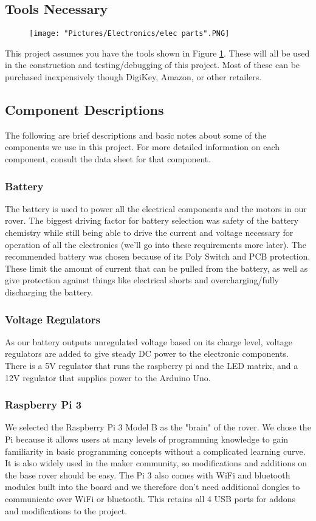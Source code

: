 \documentclass[12pt]{article}
\begin{document}
\subsection{Tools Necessary}

\begin{figure}[H]
  	\centering
   	\texttt{[image: "Pictures/Electronics/elec parts".PNG]}
  	\caption{}
	\label{elec parts}
\end{figure}

This project assumes you have the tools shown in Figure \ref{elec parts}. These will all be used in the construction and testing/debugging of this project. Most of these can be purchased inexpensively though DigiKey, Amazon, or other retailers. 

\subsection{Component Descriptions}
The following are brief descriptions and basic notes about some of the components we use in this project. For more detailed information on each component, consult the data sheet for that component. 
\subsubsection{Battery}
The battery is used to power all the electrical components and the motors in our rover. The biggest driving factor for battery selection was safety of the battery chemistry while still being able to drive the current and voltage necessary for operation of all the electronics (we'll go into these requirements more later). The recommended battery was chosen because of its Poly Switch and PCB protection. These limit the amount of current that can be pulled from the battery, as well as give protection against things like electrical shorts and overcharging/fully discharging the battery. 
\subsubsection{Voltage Regulators}
As our battery outputs unregulated voltage based on its charge level, voltage regulators are added to give steady DC power to the electronic components. There is a 5V regulator that runs the raspberry pi and the LED matrix, and a 12V regulator that supplies power to the Arduino Uno. 
\subsubsection{Raspberry Pi 3}
We selected the Raspberry Pi 3 Model B as the "brain" of the rover. We chose the Pi because it allows users at many levels of programming knowledge to gain familiarity in basic programming concepts without a complicated learning curve. It is also widely used in the maker community, so modifications and additions on the base rover should be easy. The Pi 3 also comes with WiFi and bluetooth modules built into the board and we therefore don't need additional dongles to communicate over WiFi or bluetooth.  This retains all 4 USB ports for addons and modifications to the project.  
\end{document}
